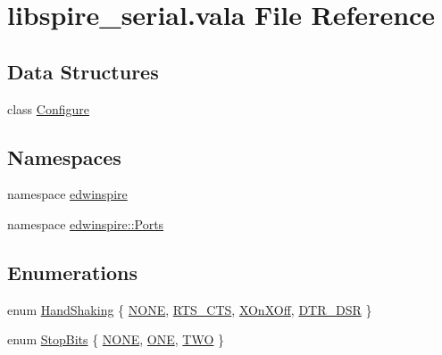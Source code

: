\hypertarget{libspire__serial_8vala}{\section{libspire\-\_\-serial.\-vala File Reference}
\label{libspire__serial_8vala}
}
\subsection*{Data Structures}
\begin{DoxyCompactItemize}
\item 
class \hyperlink{classedwinspire_1_1_ports_1_1_configure}{Configure}
\end{DoxyCompactItemize}
\subsection*{Namespaces}
\begin{DoxyCompactItemize}
\item 
namespace \hyperlink{namespaceedwinspire}{edwinspire}
\item 
namespace \hyperlink{namespaceedwinspire_1_1_ports}{edwinspire\-::\-Ports}
\end{DoxyCompactItemize}
\subsection*{Enumerations}
\begin{DoxyCompactItemize}
\item 
enum \hyperlink{namespaceedwinspire_1_1_ports_a3c4e827e4f2f517f8020ab56c3eaa742}{Hand\-Shaking} \{ \hyperlink{namespaceedwinspire_1_1_ports_a2e4c31ec0a94db405865b7c241717fbea899caa602e4fff675b17cdbab33607ec}{N\-O\-N\-E}, 
\hyperlink{namespaceedwinspire_1_1_ports_a3c4e827e4f2f517f8020ab56c3eaa742ae80f4bdedfc52e94f9596b56eef11fe9}{R\-T\-S\-\_\-\-C\-T\-S}, 
\hyperlink{namespaceedwinspire_1_1_ports_a3c4e827e4f2f517f8020ab56c3eaa742ad743775fa9d49de3e9722b06a896d482}{X\-On\-X\-Off}, 
\hyperlink{namespaceedwinspire_1_1_ports_a3c4e827e4f2f517f8020ab56c3eaa742a2a9364d1e805979ab176d7d2e116cc63}{D\-T\-R\-\_\-\-D\-S\-R}
 \}
\item 
enum \hyperlink{namespaceedwinspire_1_1_ports_a2e4c31ec0a94db405865b7c241717fbe}{Stop\-Bits} \{ \hyperlink{namespaceedwinspire_1_1_ports_a2e4c31ec0a94db405865b7c241717fbea899caa602e4fff675b17cdbab33607ec}{N\-O\-N\-E}, 
\hyperlink{namespaceedwinspire_1_1_ports_a2e4c31ec0a94db405865b7c241717fbea7a725f13af144bdef532d0389ba75e0d}{O\-N\-E}, 
\hyperlink{namespaceedwinspire_1_1_ports_a2e4c31ec0a94db405865b7c241717fbea0e793500a63ffa575b9b712ca3bc9851}{T\-W\-O}
 \}
\end{DoxyCompactItemize}
